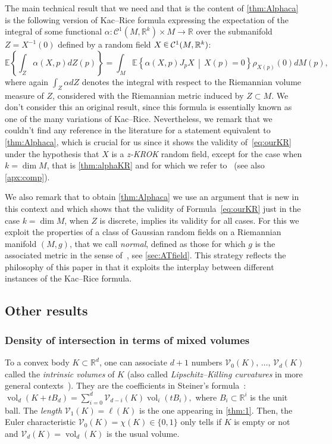 \documentclass[10pt]{amsart}
\theoremstyle{definition}\newtheorem{defi}[theo]{Definition}\newtheorem{rema}[theo]{Remark}\newtheorem{exam}[theo]{Example}\newtheorem{exem}[theo]{Example}\newtheorem{nota}[theo]{Notation}
\newcommand{\R}{\mathbb{R}}
\newcommand{\EE}{\mathbb{E}}
\DeclareMathOperator{\vol}{vol}
\newcommand{\Vint}{\mathcal{V}}
\newcommand{\mC}{\mathcal{C}}
\newcommand{\zkrok}{\emph{z-KROK}\xspace}
\renewcommand{\a}{\alpha}
\newcommand*\randin{
\mathchoice {\raisebox{-.35ex}{$\displaystyle{^\subset}$}\mkern-11.5mu\raisebox{+.45ex}{$\displaystyle{_\subset}$}} {\mkern+1mu\raisebox{-.27ex}{$\textstyle{^\subset}$}\mkern-11.7mu\raisebox{+.45ex}{$\textstyle{_\subset}$}} {\raisebox{.35ex}{$\scriptstyle\subset$}\mkern-14mu\raisebox{-.15ex}{$\scriptstyle\subset$}} {\raisebox{.3ex}{$\scriptscriptstyle\subset$}\mkern-13.5mu\raisebox{-.10ex}{$\scriptscriptstyle\subset$}}}
\begin{document}
The main technical result that we need and that is the content of \cref{thm:Alphaca} is the following version of Kac--Rice formula expressing the expectation of the integral of some functional $\a\colon \mC^1(M,\R^k)\times M\to \R$ over the submanifold $Z=X^{-1}(0)$ defined by a random field $X\,\randin\, \mC^1(M,\R^k)$:
\begin{equation}\label{eq:ourKR}
\EE\left\{\int_{ Z}\alpha(X,p)dZ(p)\right\}=\int_M
\EE\left\{ \a(X,p)J_pX\,\middle|\,X(p)=0\right\} \rho_{X(p)}(0)dM(p),
\end{equation}
where again $\int_Z\a dZ$ denotes the integral with respect to the Riemannian volume measure of $Z$, considered with the Riemannian metric induced by $Z\subset M$. We don't consider this an original result, since this formula is essentially known as one of the many variations of Kac--Rice. Nevertheless, we remark that we couldn't find any reference in the literature for a statement equivalent to \cref{thm:Alphaca}, which is crucial for us since it shows the validity of~\eqref{eq:ourKR} under the hypothesis that $X$ is a {\zkrok} random field, except for the case when $k=\dim M$, that is \cref{thm:alphaKR} and for which we refer to~\cite{KRStec} (see also \cref{apx:comp}).

We also remark that to obtain \cref{thm:Alphaca} we use an argument that is new in this context and which shows that the validity of Formula~\eqref{eq:ourKR} just in the case $k=\dim M$, when $Z$ is discrete, implies its validity for all cases. For this we exploit the properties of a class of Gaussian random fields on a Riemannian manifold $(M,g)$, that we call \emph{normal}, defined as those for which $g$ is the associated metric in the sense of~\cite{AdlerTaylor}, see \cref{sec:ATfield}. This strategy reflects the philosophy of this paper in that it exploits the interplay between different instances of the Kac--Rice formula.


\subsection{Other results}\label{sub:intro:secondary}
\subsubsection{Density of intersection in terms of mixed volumes}

To a convex body $K\subset \R^d$, one can associate $d+1$ numbers $\Vint_0(K),\,\ldots,\,\Vint_d(K)$ called the \emph{intrinsic volumes} of $K$ (also called \emph{Lipschitz--Killing curvatures} in more general contexts~\cite{AdlerTaylor}). They are the coefficients in Steiner's formula~\cite{bible}: $
\vol_d(K+tB_d)=\sum_{i=0}^d\Vint_{d-i}(K)\vol_{i}(tB_{i}), $ where $B_i\subset \R^i$ is the unit ball. The \emph{length} $\Vint_1(K)=\ell(K)$ is the one appearing in \cref{thm:1}. Then, the Euler characteristic $\Vint_0(K)=\chi(K)\in\{0,1\}$ only tells if $K$ is empty or not and $\Vint_d(K)=\vol_d(K)$ is the usual volume.
\end{document}
